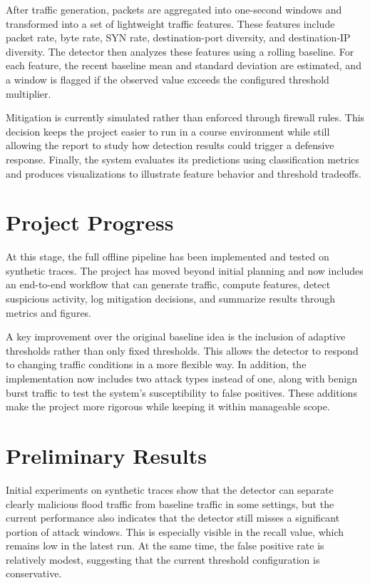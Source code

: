 \documentclass[11pt]{article}
\begin{document}
After traffic generation, packets are aggregated into one-second windows and transformed into a set of lightweight traffic features. These features include packet rate, byte rate, SYN rate, destination-port diversity, and destination-IP diversity. The detector then analyzes these features using a rolling baseline. For each feature, the recent baseline mean and standard deviation are estimated, and a window is flagged if the observed value exceeds the configured threshold multiplier.

Mitigation is currently simulated rather than enforced through firewall rules. This decision keeps the project easier to run in a course environment while still allowing the report to study how detection results could trigger a defensive response. Finally, the system evaluates its predictions using classification metrics and produces visualizations to illustrate feature behavior and threshold tradeoffs.

\section*{Project Progress}
At this stage, the full offline pipeline has been implemented and tested on synthetic traces. The project has moved beyond initial planning and now includes an end-to-end workflow that can generate traffic, compute features, detect suspicious activity, log mitigation decisions, and summarize results through metrics and figures.

A key improvement over the original baseline idea is the inclusion of adaptive thresholds rather than only fixed thresholds. This allows the detector to respond to changing traffic conditions in a more flexible way. In addition, the implementation now includes two attack types instead of one, along with benign burst traffic to test the system's susceptibility to false positives. These additions make the project more rigorous while keeping it within manageable scope.

\section*{Preliminary Results}
Initial experiments on synthetic traces show that the detector can separate clearly malicious flood traffic from baseline traffic in some settings, but the current performance also indicates that the detector still misses a significant portion of attack windows. This is especially visible in the recall value, which remains low in the latest run. At the same time, the false positive rate is relatively modest, suggesting that the current threshold configuration is conservative.
\end{document}
